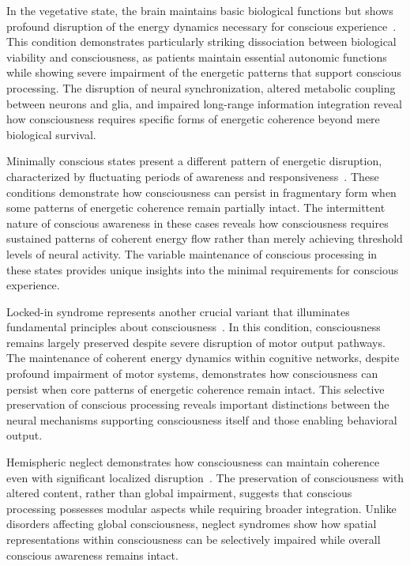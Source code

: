 In the vegetative state, the brain maintains basic biological functions but shows profound disruption of the energy dynamics necessary for conscious experience~\cite{bosl2025dynamical}. This condition demonstrates particularly striking dissociation between biological viability and consciousness, as patients maintain essential autonomic functions while showing severe impairment of the energetic patterns that support conscious processing. The disruption of neural synchronization, altered metabolic coupling between neurons and glia, and impaired long-range information integration reveal how consciousness requires specific forms of energetic coherence beyond mere biological survival.

Minimally conscious states present a different pattern of energetic disruption, characterized by fluctuating periods of awareness and responsiveness~\cite{zheng2025unbearable}. These conditions demonstrate how consciousness can persist in fragmentary form when some patterns of energetic coherence remain partially intact. The intermittent nature of conscious awareness in these cases reveals how consciousness requires sustained patterns of coherent energy flow rather than merely achieving threshold levels of neural activity. The variable maintenance of conscious processing in these states provides unique insights into the minimal requirements for conscious experience.

Locked-in syndrome represents another crucial variant that illuminates fundamental principles about consciousness~\cite{pinotsis2023vivo}. In this condition, consciousness remains largely preserved despite severe disruption of motor output pathways. The maintenance of coherent energy dynamics within cognitive networks, despite profound impairment of motor systems, demonstrates how consciousness can persist when core patterns of energetic coherence remain intact. This selective preservation of conscious processing reveals important distinctions between the neural mechanisms supporting consciousness itself and those enabling behavioral output.

Hemispheric neglect demonstrates how consciousness can maintain coherence even with significant localized disruption~\cite{hunt2024electromagnetic}. The preservation of consciousness with altered content, rather than global impairment, suggests that conscious processing possesses modular aspects while requiring broader integration. Unlike disorders affecting global consciousness, neglect syndromes show how spatial representations within consciousness can be selectively impaired while overall conscious awareness remains intact.

